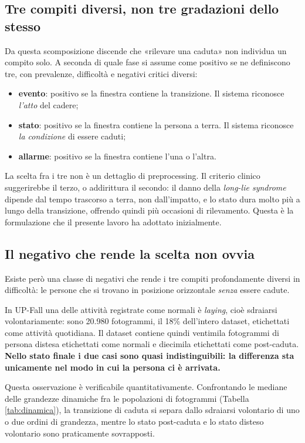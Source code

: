 \subsection{Tre compiti diversi, non tre gradazioni dello stesso}

Da questa scomposizione discende che «rilevare una caduta» non individua un
compito solo. A seconda di quale fase si assume come positivo se ne definiscono
tre, con prevalenze, difficoltà e negativi critici diversi:

\begin{itemize}
    \item \textbf{evento}: positivo se la finestra contiene la transizione.
          Il sistema riconosce \emph{l'atto} del cadere;
    \item \textbf{stato}: positivo se la finestra contiene la persona a terra.
          Il sistema riconosce \emph{la condizione} di essere caduti;
    \item \textbf{allarme}: positivo se la finestra contiene l'una o l'altra.
\end{itemize}

La scelta fra i tre non è un dettaglio di preprocessing. Il criterio clinico
suggerirebbe il terzo, o addirittura il secondo: il danno della \emph{long-lie
syndrome} dipende dal tempo trascorso a terra, non dall'impatto, e lo stato dura
molto più a lungo della transizione, offrendo quindi più occasioni di
rilevamento. Questa è la formulazione che il presente lavoro ha adottato
inizialmente.

\subsection{Il negativo che rende la scelta non ovvia}

Esiste però una classe di negativi che rende i tre compiti profondamente
diversi in difficoltà: le persone che si trovano in posizione orizzontale
\emph{senza} essere cadute.

In UP-Fall una delle attività registrate come normali è \emph{laying}, cioè
sdraiarsi volontariamente: sono 20.980 fotogrammi, il 18\% dell'intero dataset,
etichettati come attività quotidiana. Il dataset contiene quindi ventimila
fotogrammi di persona distesa etichettati come normali e diecimila etichettati
come post-caduta. \textbf{Nello stato finale i due casi sono quasi
indistinguibili: la differenza sta unicamente nel modo in cui la persona ci è
arrivata.}

Questa osservazione è verificabile quantitativamente. Confrontando le mediane
delle grandezze dinamiche fra le popolazioni di fotogrammi (Tabella
\ref{tab:dinamica}), la transizione di caduta si separa dallo sdraiarsi
volontario di uno o due ordini di grandezza, mentre lo stato post-caduta e lo
stato disteso volontario sono praticamente sovrapposti.


